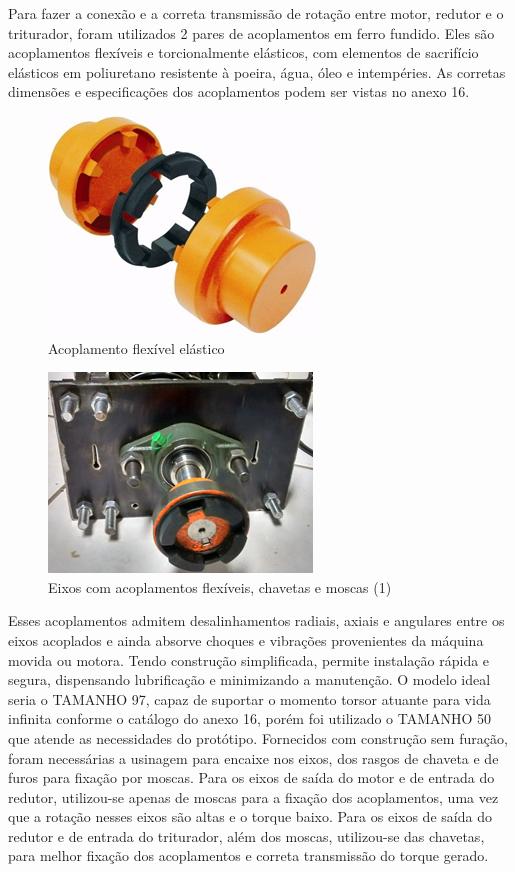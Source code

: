 Para fazer a conexão e a correta transmissão de rotação entre motor, redutor e o triturador, foram utilizados 2 pares de acoplamentos em ferro fundido. Eles são acoplamentos flexíveis e torcionalmente elásticos, com elementos de sacrifício elásticos em poliuretano resistente à poeira, água, óleo e intempéries. As corretas dimensões e especificações dos acoplamentos podem ser vistas no anexo 16.

\begin{figure}[!h]
	\centering
		\includegraphics[scale=0.6]{figuras/estrutura/17.png}
	\caption{Acoplamento flexível elástico}
\end{figure}

\begin{figure}[!h]
	\centering
		\includegraphics[scale=0.6]{figuras/estrutura/18(1).png}
	\caption{Eixos com acoplamentos flexíveis, chavetas e moscas (1)}
\end{figure}

Esses acoplamentos admitem desalinhamentos radiais, axiais e angulares entre os eixos acoplados e ainda absorve choques e vibrações provenientes da máquina movida ou motora. Tendo construção simplificada, permite instalação rápida e segura, dispensando lubrificação e minimizando a manutenção. O modelo ideal seria o TAMANHO 97, capaz de suportar o momento torsor atuante para vida infinita conforme o catálogo do anexo 16, porém foi utilizado o TAMANHO 50 que atende as necessidades do protótipo. Fornecidos com construção sem furação, foram necessárias a usinagem para encaixe nos eixos, dos rasgos de chaveta e de furos  para fixação por moscas. Para os eixos de saída do motor e de entrada do redutor, utilizou-se apenas de moscas para a fixação dos acoplamentos, uma vez que a rotação nesses eixos são altas e o torque baixo. Para os eixos de saída do redutor e de entrada do triturador, além dos moscas, utilizou-se das chavetas, para melhor fixação dos acoplamentos e correta transmissão do torque gerado.  


